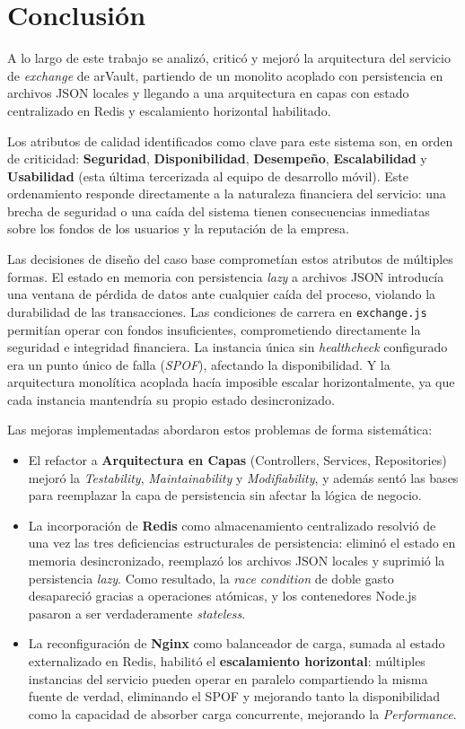 \section{Conclusión}
\label{sec:conclusion}

A lo largo de este trabajo se analizó, criticó y mejoró la arquitectura del servicio de \textit{exchange} de arVault, partiendo de un monolito acoplado con persistencia en archivos JSON locales y llegando a una arquitectura en capas con estado centralizado en Redis y escalamiento horizontal habilitado.

Los atributos de calidad identificados como clave para este sistema son, en orden de criticidad: \textbf{Seguridad}, \textbf{Disponibilidad}, \textbf{Desempeño}, \textbf{Escalabilidad} y \textbf{Usabilidad} (esta última tercerizada al equipo de desarrollo móvil). Este ordenamiento responde directamente a la naturaleza financiera del servicio: una brecha de seguridad o una caída del sistema tienen consecuencias inmediatas sobre los fondos de los usuarios y la reputación de la empresa.

Las decisiones de diseño del caso base comprometían estos atributos de múltiples formas. El estado en memoria con persistencia \textit{lazy} a archivos JSON introducía una ventana de pérdida de datos ante cualquier caída del proceso, violando la durabilidad de las transacciones. Las condiciones de carrera en \texttt{exchange.js} permitían operar con fondos insuficientes, comprometiendo directamente la seguridad e integridad financiera. La instancia única sin \textit{healthcheck} configurado era un punto único de falla (\textit{SPOF}), afectando la disponibilidad. Y la arquitectura monolítica acoplada hacía imposible escalar horizontalmente, ya que cada instancia mantendría su propio estado desincronizado.

Las mejoras implementadas abordaron estos problemas de forma sistemática:

\begin{itemize}
    \item El refactor a \textbf{Arquitectura en Capas} (Controllers, Services, Repositories) mejoró la \textit{Testability}, \textit{Maintainability} y \textit{Modifiability}, y además sentó las bases para reemplazar la capa de persistencia sin afectar la lógica de negocio.
    \item La incorporación de \textbf{Redis} como almacenamiento centralizado resolvió de una vez las tres deficiencias estructurales de persistencia: eliminó el estado en memoria desincronizado, reemplazó los archivos JSON locales y suprimió la persistencia \textit{lazy}. Como resultado, la \textit{race condition} de doble gasto desapareció gracias a operaciones atómicas, y los contenedores Node.js pasaron a ser verdaderamente \textit{stateless}.
    \item La reconfiguración de \textbf{Nginx} como balanceador de carga, sumada al estado externalizado en Redis, habilitó el \textbf{escalamiento horizontal}: múltiples instancias del servicio pueden operar en paralelo compartiendo la misma fuente de verdad, eliminando el SPOF y mejorando tanto la disponibilidad como la capacidad de absorber carga concurrente, mejorando la \textit{Performance}.
\end{itemize}

